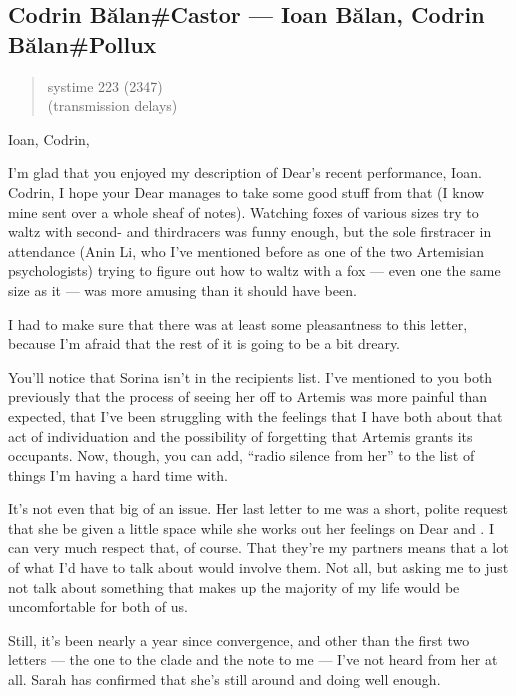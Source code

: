 \hypertarget{codrin-bux103lancastor-ioan-bux103lan-codrin-bux103lanpollux}{%
\subsection{Codrin Bălan\#Castor — Ioan Bălan, Codrin Bălan\#Pollux}\label{codrin-bux103lancastor-ioan-bux103lan-codrin-bux103lanpollux}}

\begin{quote}
systime 223 (2347)\\
(transmission delays)
\end{quote}

Ioan, Codrin,

I'm glad that you enjoyed my description of Dear's recent performance, Ioan. Codrin, I hope your Dear manages to take some good stuff from that (I know mine sent over a whole sheaf of notes). Watching foxes of various sizes try to waltz with second- and thirdracers was funny enough, but the sole firstracer in attendance (Anin Li, who I've mentioned before as one of the two Artemisian psychologists) trying to figure out how to waltz with a fox — even one the same size as it — was more amusing than it should have been.

I had to make sure that there was at least some pleasantness to this letter, because I'm afraid that the rest of it is going to be a bit dreary.

You'll notice that Sorina isn't in the recipients list. I've mentioned to you both previously that the process of seeing her off to Artemis was more painful than expected, that I've been struggling with the feelings that I have both about that act of individuation and the possibility of forgetting that Artemis grants its occupants. Now, though, you can add, ``radio silence from her'' to the list of things I'm having a hard time with.

It's not even that big of an issue. Her last letter to me was a short, polite request that she be given a little space while she works out her feelings on Dear and \Partner . I can very much respect that, of course. That they're my partners means that a lot of what I'd have to talk about would involve them. Not all, but asking me to just not talk about something that makes up the majority of my life would be uncomfortable for both of us.

Still, it's been nearly a year since convergence, and other than the first two letters — the one to the clade and the note to me — I've not heard from her at all. Sarah has confirmed that she's still around and doing well enough.

